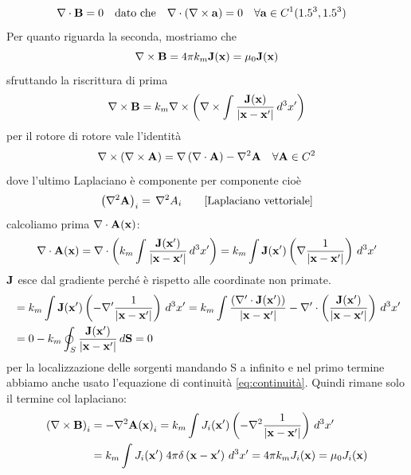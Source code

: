 \begin{align}
  \nabla\cdot\mathbf{ B } &= 0 \quad \text{dato che} \quad \nabla\cdot \left( \mathbf{ \mathbf{\nabla}\times\mathbf{ a } } \right) = 0 \quad \forall \mathbf{a} \in C^1(1.5^3,1.5^3)
\end{align}
Per quanto riguarda la seconda, mostriamo che
\begin{equation}
  \mathbf{\nabla}\times\mathbf{ B } = 4\pi k_m \mathbf{ J(x) } = \mu_0 \mathbf{ J(x) }
\end{equation}
sfruttando la riscrittura di prima
\begin{align}
  \mathbf{\nabla}\times\mathbf{ B } = k_m \nabla \times \left( \nabla \times  \int \frac{\mathbf{ J(x) } }{|\mathbf{ x-x' }|} \,d^3x' \right)
\end{align}
per il rotore di rotore vale l'identità
\begin{equation}
  \nabla \times  \left(\nabla \times \mathbf{ A } \right) = \nabla\left( \nabla\cdot \mathbf{ A } \right) - \nabla^2 \mathbf{ A } \quad \forall \mathbf{ A } \in C^2
\end{equation}
dove l'ultimo Laplaciano è componente per componente cioè
\begin{align}
  \left( \nabla^2 \mathbf{ A } \right) _i = \, \nabla^2 A_i  \tag*{[Laplaciano vettoriale]}
\end{align}
calcoliamo prima $ \nabla\cdot \mathbf{ A(x) } $:
\begin{align}
  \nabla \cdot \mathbf{ A(x) } = \nabla \cdot \left(k_m \int \frac{\mathbf{ J(x') }}{\mathbf{ |x-x'| }} \, d^3x' \right) 
  = k_m \int \mathbf{ J(x') } \left( \nabla \frac{1}{\mathbf{ |x-x'| }} \right) \,d^3x'
\end{align}
$ \mathbf{ J } $ esce dal gradiente perché è rispetto alle coordinate non primate.
\begin{align}
  &= k_m \int \mathbf{ J(x') } \left( -\nabla' \frac{1}{\mathbf{ |x-x'| }} \right) \,d^3x' 
  = k_m \int \frac{\left( \nabla' \cdot \mathbf{ J(x') } \right)}{\mathbf{ |x-x'| }} - \nabla' \cdot \left( \frac{\mathbf{ J(x') }}{\mathbf{ |x-x'| }} \right) \,d^3x'\\
  &= 0 - k_m \oint_S \frac{\mathbf{ J(x') }}{\mathbf{ |x-x'| }} \,d\mathbf{ S } = 0
\end{align}
per la localizzazione delle sorgenti mandando S a infinito e nel primo termine abbiamo anche usato l'equazione di continuità \eqref{eq:continuità}.
Quindi rimane solo il termine col laplaciano:
\begin{align}
  \left( \mathbf{\nabla}\times\mathbf{ B } \right)_i &= -\nabla^2\mathbf{ A(x) }_i = k_m \int J_i(\mathbf{ x' }) \left( -\nabla^2 \frac{1}{\mathbf{ |x-x'| }} \right) \,d^3x'\\
  &= k_m \int J_i \mathbf{ (x') } \; 4\pi \delta \left( \mathbf{ x-x' } \right) \,d^3x' = 4\pi k_m J_i (\mathbf{ x }) = \mu_0 J_i (\mathbf{ x })
\end{align}
